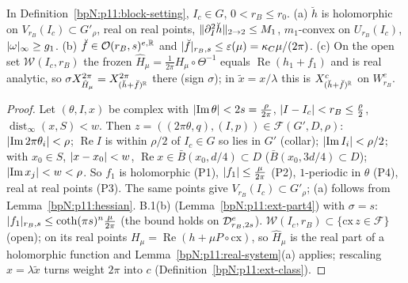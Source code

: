 \begin{lemma}\label{bpN:p11:domain}
In Definition~\ref{bpN:p11:block-setting}, $I_c\in G$, $0<r_B\le r_0$. (a) $\breve h$ is holomorphic on $V_{r_B}(I_c)\subset G'_\rho$, real on real points, $\lVert \partial_I^2\breve h\rVert_{2\to2}\le M_1$, $m_1$-convex on $U_{r_B}(I_c)$, $\lvert \omega\rvert_\infty\ge g_1$. (b) $\breve f\in\mathcal O(r_B,s)^{e,\mathbb{R}}$ and $\lvert \breve f\rvert_{r_B,s}\le\varepsilon(\mu)=\kappa_C\mu/(2\pi)$. (c) On the open set $\mathcal W(I_c,r_B)$ the frozen $\hat H_\mu=\frac1{2\pi}H_\mu\circ\Theta^{-1}$ equals $\operatorname{Re}(h_1+f_1)$ and is real analytic, so $\sigma X^{2\pi}_{\hat H_\mu}=X^{2\pi}_{(\breve h+\breve f)^{\mathbb{R}}}$ there (sign $\sigma$); in $\tilde x=x/\lambda$ this is $X^c_{(\breve h+\breve f)^{\mathbb{R}}}$ on $W^e_{r_B}$.
\end{lemma}
\begin{proof}
\label{stepN:p11:dm-pts} Let $(\theta,I,x)$ be complex with $\lvert \operatorname{Im}\theta\rvert<2s=\frac\rho{2\pi}$, $\lvert I-I_c\rvert<r_B\le\frac\rho2$, $\operatorname{dist}_\infty(x,S)<w$. Then $z=((2\pi\theta,q),(I,p))\in\mathcal F(G',D,\rho)$: $\lvert \operatorname{Im}2\pi\theta_i\rvert<\rho$; $\operatorname{Re}I$ is within $\rho/2$ of $I_c\in G$ so lies in $G'$ (collar); $\lvert \operatorname{Im}I_i\rvert<\rho/2$; with $x_0\in S$, $\lvert x-x_0\rvert<w$, $\operatorname{Re}x\in\bar B(x_0,d/4)\subset D$ ($\bar B(x_0,3d/4)\subset D$); $\lvert \operatorname{Im}x_j\rvert<w<\rho$. So $f_1$ is holomorphic (P1), $\lvert f_1\rvert\le\frac\mu{2\pi}$ (P2), $1$-periodic in $\theta$ (P4), real at real points (P3). The same points give $V_{r_B}(I_c)\subset G'_\rho$; (a) follows from Lemma~\ref{bpN:p11:hessian}.
\label{stepN:p11:dm-norm} B.1(b) (Lemma~\ref{bpN:p11:ext-part4}) with $\sigma=s$: $\lvert f_1\rvert_{r_B,s}\le\coth(\pi s)^n\frac\mu{2\pi}$ (the bound holds on $\mathcal D_{r_B,2s}^e$).
\label{stepN:p11:dm-field} $\mathcal W(I_c,r_B)\subset\{\mathrm{cx}\,z\in\mathcal F\}$ (open); on its real points $H_\mu=\operatorname{Re}(h+\mu P\circ\mathrm{cx})$, so $\hat H_\mu$ is the real part of a holomorphic function and Lemma~\ref{bpN:p11:real-system}(a) applies; rescaling $x=\lambda\tilde x$ turns weight $2\pi$ into $c$ (Definition~\ref{bpN:p11:ext-class}).
\end{proof}

